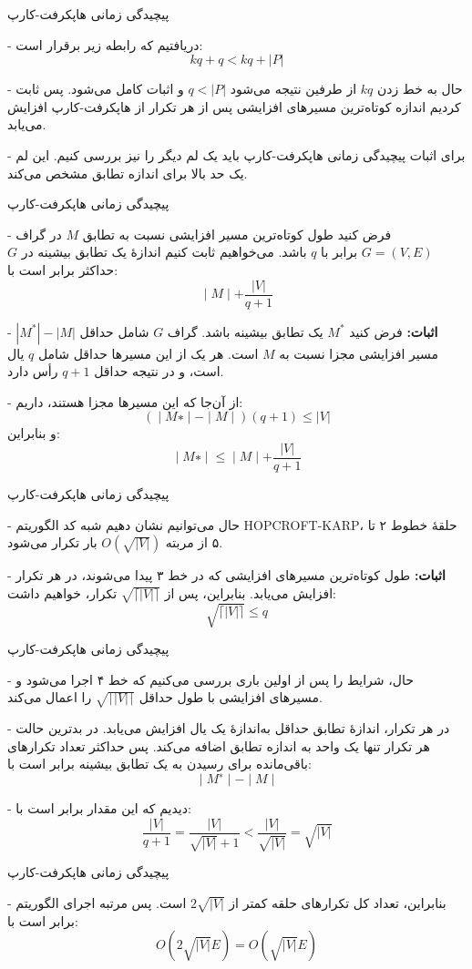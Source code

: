 \begin{itemframe}{‌پیچیدگی زمانی هاپکرفت-کارپ}
\item[-]
دریافتیم که رابطه زیر برقرار است:
$$
kq+q  < kq + |P|
$$
\item[-]
حال به خط زدن $kq$ از طرفین نتیجه می‌شود
$q < |P|$
و اثبات کامل می‌شود. پس ثابت کردیم اندازه کوتاه‌ترین مسیرهای افزایشی پس از هر تکرار از هاپکرفت-کارپ افزایش می‌یابد.
\item[-]
برای اثبات پیچیدگی زمانی هاپکرفت-کارپ باید یک لم دیگر را نیز بررسی کنیم. این لم یک حد بالا برای اندازه تطابق مشخص می‌کند.
\end{itemframe}


\begin{itemframe}{‌پیچیدگی زمانی هاپکرفت-کارپ}
\decLineSpace[0mm]
\item[-]
فرض کنید طول کوتاه‌ترین مسیر افزایشی نسبت به تطابق $M$ در گراف $G = (V, E)$ برابر با $q$ باشد. می‌خواهیم ثابت کنیم اندازهٔ یک تطابق بیشینه در $G$ حداکثر برابر است با:
$$∣M∣+ \frac{ |V|}{q + 1}$$

\item[-]
\textbf{اثبات:}
فرض کنید $M^*$ یک تطابق بیشینه باشد. گراف $G$ شامل حداقل $|M^*| - |M|$ مسیر افزایشی مجزا نسبت به $M$ است.
هر یک از این مسیرها حداقل شامل $q$ یال است، و در نتیجه حداقل
$q + 1$
رأس دارد.
\item[-]
از آن‌جا که این مسیرها مجزا هستند، داریم:
$$(∣M∗∣−∣M∣)(q+1) \leq |V|$$
و بنابراین:
$$∣M∗∣ \leq∣M∣ + \frac{|V|}{q + 1}$$
\end{itemframe}


\begin{itemframe}{‌پیچیدگی زمانی هاپکرفت-کارپ}
\item[-]
حال می‌توانیم نشان دهیم شبه کد الگوریتم HOPCROFT-KARP، حلقهٔ خطوط ۲ تا ۵ از مربته $O(\sqrt{|V|})$ بار تکرار می‌شود.

\item[-]
\textbf{اثبات:}
طول کوتاه‌ترین مسیرهای افزایشی که در خط ۳ پیدا می‌شوند، در هر تکرار افزایش می‌یابد. بنابراین، پس از
$\sqrt{\lceil |V| \rceil}$
تکرار، خواهیم داشت:
$$\sqrt{\lceil |V| \rceil} \leq q$$
\end{itemframe}


\begin{itemframe}{‌پیچیدگی زمانی هاپکرفت-کارپ}
\item[-]
حال، شرایط را پس از اولین باری بررسی می‌کنیم که خط ۴ اجرا می‌شود و مسیرهای افزایشی با طول حداقل
$\sqrt{\lceil |V| \rceil}$
 را اعمال می‌کند.
\item[-]
در هر تکرار، اندازهٔ تطابق حداقل به‌اندازهٔ یک یال افزایش می‌یابد. در بدترین حالت هر تکرار تنها یک واحد به اندازه تطابق اضافه می‌کند. پس حداکثر تعداد تکرارهای باقی‌مانده برای رسیدن به یک تطابق بیشینه برابر است با:
$$
∣M^∗∣−∣M∣
$$
\item[-]
دیدیم که این مقدار برابر است با:
$$
\frac{ |V|}{q + 1} = \frac{|V|}{\sqrt{|V|} + 1} < \frac{|V|}{\sqrt{|V|}} = \sqrt{|V|}
$$

\end{itemframe}


\begin{itemframe}{‌پیچیدگی زمانی هاپکرفت-کارپ}
\item[-]
بنابراین، تعداد کل تکرارهای حلقه کمتر از $2\sqrt{|V|}$ است. پس مرتبه اجرای الگوریتم برابر است با:
$$
O(2\sqrt{|V|} E) = O(\sqrt{|V|} E)
$$
\end{itemframe}
\iffalse
\fi
